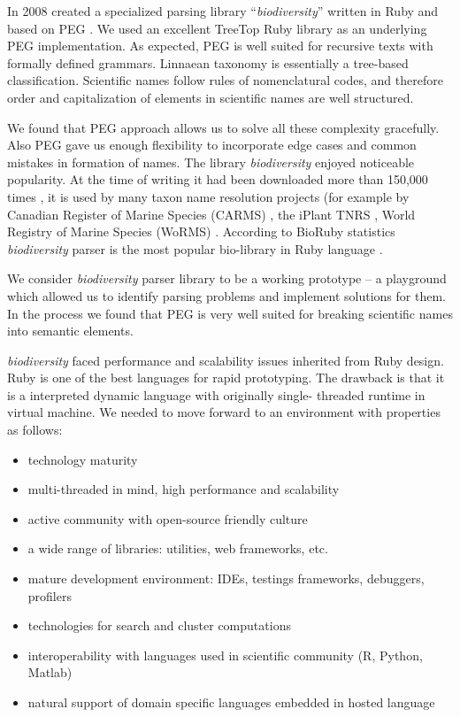 \documentclass{bmcart}
\begin{document}
In 2008 created a specialized parsing library ``\textit{biodiversity}''
\cite{biodiversity} written in Ruby and based on PEG \cite{Ford2004}. We used
an excellent TreeTop Ruby library
\cite{treetop} as an underlying PEG implementation. As expected, PEG is well
suited for recursive texts with formally defined grammars. Linnaean taxonomy
is essentially a tree-based classification. Scientific names follow rules of
nomenclatural codes, and therefore order and capitalization of elements in
scientific names are well structured.

We found that PEG approach allows us to solve all these complexity gracefully.
Also PEG gave us enough flexibility to incorporate edge cases and common
mistakes in formation of names. The library \textit{biodiversity} enjoyed
noticeable popularity. At the time of writing it had been downloaded more than
150,000 times \cite{bdiv_downloads}, it is used by many taxon name resolution
projects (for example by Canadian Register of Marine Species (CARMS)
\cite{carms}, the iPlant TNRS \cite{iplant}, World Registry of Marine Species
(WoRMS) \cite{worms}.  According to BioRuby statistics \textit{biodiversity}
parser is the most popular bio-library in Ruby language \cite{biogems}.

We consider \textit{biodiversity} parser library to be a working prototype --
a playground which allowed us to identify parsing problems and implement
solutions for them. In the process we found that PEG is very well suited for
breaking scientific names into semantic elements.

\textit{biodiversity} faced performance and scalability issues inherited from
Ruby design. Ruby is one of the best languages for rapid prototyping. The
drawback is that it is a interpreted dynamic language with originally single-
threaded runtime in virtual machine. We needed to move forward to an
environment with properties as follows:

\begin{itemize}
    \item technology maturity
    \item multi-threaded in mind, high performance and scalability
    \item active community with open-source friendly culture
    \item a wide range of libraries: utilities, web frameworks, etc.
    \item mature development environment: IDEs, testings frameworks,
    debuggers, profilers
    \item technologies for search and cluster computations
    \item interoperability with languages used in scientific community (R,
    Python, Matlab)
    \item natural support of domain specific languages embedded in hosted
    language
\end{itemize}
\end{document}
